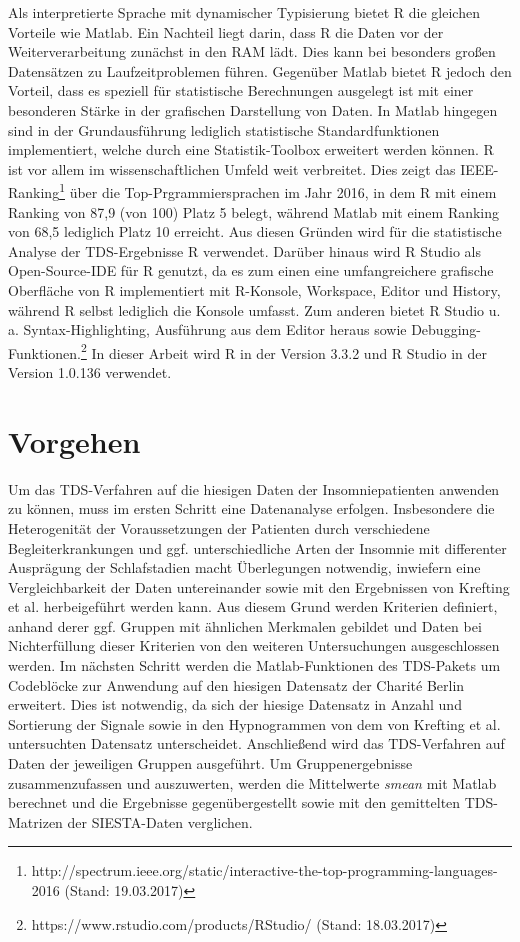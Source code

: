 Als interpretierte Sprache mit dynamischer Typisierung bietet R die gleichen Vorteile wie Matlab. Ein Nachteil liegt darin, dass R die Daten vor der Weiterverarbeitung zunächst in den RAM lädt. Dies kann bei besonders großen Datensätzen zu Laufzeitproblemen führen. Gegenüber Matlab bietet R jedoch den Vorteil, dass es speziell für statistische Berechnungen ausgelegt ist mit einer besonderen Stärke in der grafischen Darstellung von Daten. In Matlab hingegen sind in der Grundausführung lediglich statistische Standardfunktionen implementiert, welche durch eine Statistik-Toolbox erweitert werden können. R ist vor allem im wissenschaftlichen Umfeld weit verbreitet. Dies zeigt das IEEE-Ranking\footnote{http://spectrum.ieee.org/static/interactive-the-top-programming-languages-2016 (Stand: 19.03.2017)} über die Top-Prgrammiersprachen im Jahr 2016, in dem R mit einem Ranking von 87,9 (von 100) Platz 5 belegt, während Matlab mit einem Ranking von 68,5 lediglich Platz 10 erreicht. Aus diesen Gründen wird für die statistische Analyse der \acs{TDS}-Ergebnisse R verwendet. Darüber hinaus wird R Studio als Open-Source-IDE für R genutzt, da es zum einen eine umfangreichere grafische Oberfläche von R implementiert mit R-Konsole, Workspace, Editor und History, während R selbst lediglich die Konsole umfasst. Zum anderen bietet R Studio u. a. Syntax-Highlighting, Ausführung aus dem Editor heraus sowie Debugging-Funktionen.\footnote{https://www.rstudio.com/products/RStudio/ (Stand: 18.03.2017)} In dieser Arbeit wird R in der Version 3.3.2 und R Studio in der Version 1.0.136 verwendet.

\section{Vorgehen}

Um das \acs{TDS}-Verfahren auf die hiesigen Daten der Insomniepatienten anwenden zu können, muss im ersten Schritt eine Datenanalyse erfolgen. Insbesondere die Heterogenität der Voraussetzungen der Patienten durch verschiedene Begleiterkrankungen und ggf. unterschiedliche Arten der Insomnie mit differenter Ausprägung der Schlafstadien macht Überlegungen notwendig, inwiefern eine Vergleichbarkeit der Daten untereinander sowie mit den Ergebnissen von Krefting et al. \parencite{krefting_age_2017} herbeigeführt werden kann. Aus diesem Grund werden Kriterien definiert, anhand derer ggf. Gruppen mit ähnlichen Merkmalen gebildet und Daten bei Nichterfüllung dieser Kriterien von den weiteren Untersuchungen ausgeschlossen werden. Im nächsten Schritt werden die Matlab-Funktionen des \acs{TDS}-Pakets um Codeblöcke zur Anwendung auf den hiesigen Datensatz der Charit\'{e} Berlin erweitert. Dies ist notwendig, da sich der hiesige Datensatz in Anzahl und Sortierung der Signale sowie in den Hypnogrammen von dem von Krefting et al. untersuchten Datensatz unterscheidet. Anschließend wird das \acs{TDS}-Verfahren auf Daten der jeweiligen Gruppen ausgeführt. Um Gruppenergebnisse zusammenzufassen und auszuwerten, werden die Mittelwerte \textit{smean} mit Matlab berechnet und die Ergebnisse gegenübergestellt sowie mit den gemittelten \acs{TDS}-Matrizen der SIESTA-Daten verglichen.\\

